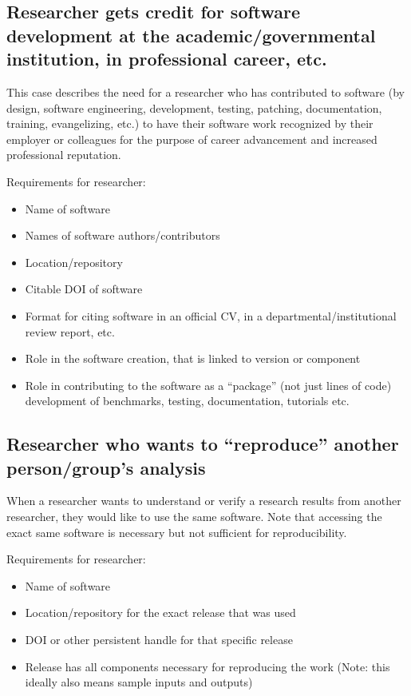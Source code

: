 \documentclass[12pt, oneside]{amsart}
\begin{document}
\subsection{Researcher gets credit for software development at the academic\slash governmental institution, in professional career, etc.}

This case describes the need for a researcher who has contributed to software (by design, software engineering, development, testing, patching, documentation, training, evangelizing, etc.)
to have their software work recognized by their employer or colleagues for the purpose of career advancement and increased professional reputation.

Requirements for researcher:
\begin{itemize}
\item Name of software
\item Names of software authors/contributors
\item Location/repository
\item Citable DOI of software
\item Format for citing software in an official CV, in a departmental/institutional review report, etc.
\item Role in the software creation, that is linked to version or component
\item Role in contributing to the software as a ``package'' (not just lines of code) development of benchmarks, testing, documentation, tutorials etc.
\end{itemize}

\subsection{Researcher who wants to ``reproduce'' another person\slash group's analysis}

When a researcher wants to understand or verify a research results from another researcher, they
would like to use the same software.  Note that accessing the exact same software is necessary but not sufficient for reproducibility.

Requirements for researcher:
\begin{itemize}
\item Name of software
\item Location/repository for the exact release that was used
\item DOI or other persistent handle for that specific release
\item Release has all components necessary for reproducing the work (Note: this ideally also means sample inputs and outputs)
\end{itemize}
\end{document}

